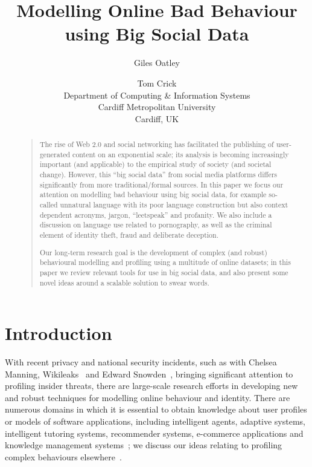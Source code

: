 \documentclass[letterpaper]{article}
\begin{document}
\title{Modelling Online Bad Behaviour using Big Social Data}
\author{Giles Oatley \and Tom Crick\\
Department of Computing \& Information Systems\\
Cardiff Metropolitan University\\
Cardiff, UK
}

\maketitle

\begin{abstract}
\begin{quote}
The rise of Web 2.0 and social networking has facilitated the
publishing of user-generated content on an exponential scale; its
analysis is becoming increasingly important (and applicable) to the
empirical study of society (and societal change). However, this ``big
social data'' from social media platforms differs significantly from
more traditional/formal sources.  In this paper we focus our attention
on modelling bad behaviour using big social data, for example
so-called unnatural language with its poor language construction but
also context dependent acronyms, jargon, ``leetspeak'' and
profanity. We also include a discussion on language use related to
pornography, as well as the criminal element of identity theft, fraud
and deliberate deception.

Our long-term research goal is the development of complex (and robust)
behavioural modelling and profiling using a multitude of online
datasets; in this paper we review relevant tools for use in big social
data, and also present some novel ideas around a scalable solution to
swear words.
\end{quote}
\end{abstract}


\section{Introduction}

With recent privacy and national security incidents, such as with
Chelsea Manning, Wikileaks~\cite{wikileaks:2013} and Edward
Snowden~\cite{greenwald:2014}, bringing significant attention to
profiling insider threats, there are large-scale research efforts in
developing new and robust techniques for modelling online behaviour
and identity. There are numerous domains in which it is essential to
obtain knowledge about user profiles or models of software
applications, including intelligent agents, adaptive systems,
intelligent tutoring systems, recommender systems, e-commerce
applications and knowledge management
systems~\cite{schiaffino+amandi:2009}; we discuss our ideas relating
to profiling complex behaviours elsewhere~\cite{oatley+crick:2014}.
\end{document}
